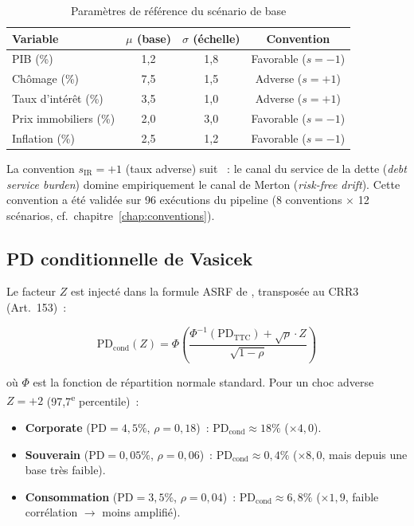 \documentclass[12pt, a4paper, twoside, openright]{report}
\theoremstyle{definition}
\begin{document}
\begin{table}[htbp]
\centering
\caption{Paramètres de référence du scénario de base}
\label{tab:scenario-base-z}
\begin{tabular}{lccc}
\toprule
\textbf{Variable} & $\mu$ (base) & $\sigma$ (échelle) & \textbf{Convention} \\
\midrule
PIB (\%) & 1,2 & 1,8 & Favorable ($s=-1$) \\
Chômage (\%) & 7,5 & 1,5 & Adverse ($s=+1$) \\
Taux d'intérêt (\%) & 3,5 & 1,0 & Adverse ($s=+1$) \\
Prix immobiliers (\%) & 2,0 & 3,0 & Favorable ($s=-1$) \\
Inflation (\%) & 2,5 & 1,2 & Favorable ($s=-1$) \\
\bottomrule
\end{tabular}
\end{table}

La convention $s_{\text{IR}} = +1$ (taux adverse) suit \citet{duffie2007}~: le canal du service de la dette (\textit{debt service burden}) domine empiriquement le canal de Merton (\textit{risk-free drift}). Cette convention a été validée sur 96 exécutions du pipeline (8 conventions $\times$ 12 scénarios, cf.\ chapitre~\ref{chap:conventions}).

\subsection{PD conditionnelle de Vasicek}

Le facteur $Z$ est injecté dans la formule ASRF de \citet{vasicek2002}, transposée au CRR3 (Art.~153)~:

\begin{equation}
\text{PD}_{\text{cond}}(Z) = \Phi\!\left(\frac{\Phi^{-1}(\text{PD}_{\text{TTC}}) + \sqrt{\rho} \cdot Z}{\sqrt{1 - \rho}}\right)
\label{eq:vasicek-multi}
\end{equation}

\noindent où $\Phi$ est la fonction de répartition normale standard. Pour un choc adverse $Z = +2$ (97,7\textsuperscript{e} percentile)~:

\begin{itemize}
\item \textbf{Corporate} ($\text{PD}=4{,}5\%$, $\rho=0{,}18$)~: $\text{PD}_{\text{cond}} \approx 18\%$ ($\times 4{,}0$).
\item \textbf{Souverain} ($\text{PD}=0{,}05\%$, $\rho=0{,}06$)~: $\text{PD}_{\text{cond}} \approx 0{,}4\%$ ($\times 8{,}0$, mais depuis une base très faible).
\item \textbf{Consommation} ($\text{PD}=3{,}5\%$, $\rho=0{,}04$)~: $\text{PD}_{\text{cond}} \approx 6{,}8\%$ ($\times 1{,}9$, faible corrélation $\to$ moins amplifié).
\end{itemize}
\end{document}
